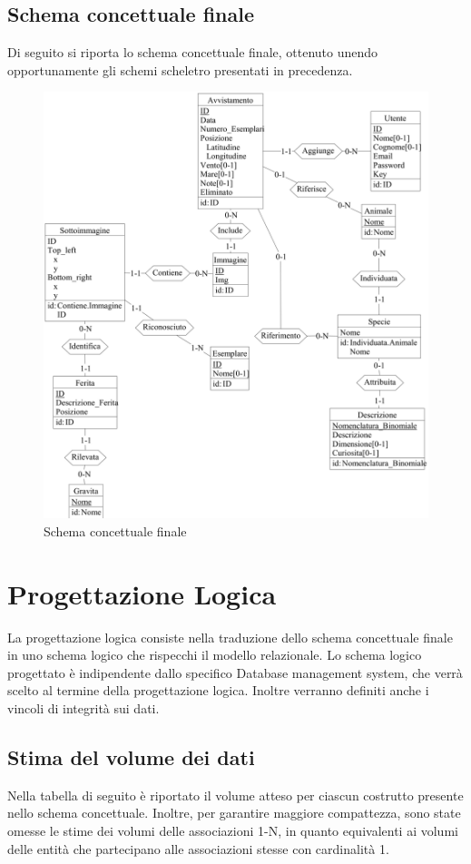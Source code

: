 \documentclass[a4paper,final,12pt]{report}
\begin{document}
\subsection{Schema concettuale finale}
Di seguito si riporta lo schema concettuale finale, ottenuto unendo opportunamente gli schemi scheletro presentati in precedenza.
\newpage
\begin{figure}[hbtp]
\centering
\includegraphics[scale=0.1]{img_concettuale/ER2.png}
\caption{Schema concettuale finale}
\end{figure}



\section{Progettazione Logica}
La progettazione logica consiste nella traduzione dello schema concettuale finale in uno schema logico che rispecchi il modello relazionale. Lo schema logico progettato è indipendente dallo specifico Database management system, che verrà scelto al termine della progettazione logica. Inoltre verranno definiti anche i vincoli di integrità sui dati.

\subsection{Stima del volume dei dati}
Nella tabella di seguito è riportato il volume atteso per ciascun costrutto presente nello schema concettuale.
Inoltre, per garantire maggiore compattezza, sono state omesse le stime dei volumi delle associazioni 1-N, in quanto equivalenti ai volumi delle entità che partecipano alle associazioni stesse con cardinalità 1.
\end{document}
